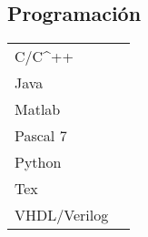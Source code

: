 \documentclass[a4paper,10pt]{article}
\begin{document}
\begin{adjustbox}{valign=t}
\begin{minipage}{0.60\textwidth}
\begin{multicols}{2}
\section*{Programación}
\begin{tabular}{ll}
	C/C^{++}        & 
	\\
	Java            & 
	\\	
	Matlab 	    	& 
	\\
	Pascal 7    	& 
	\\
		Python    	& 
	\\
		Tex 	    & 
	\\
	VHDL/Verilog 	& 
\end{tabular}
\end{multicols}
\end{minipage}
\end{adjustbox}
\end{document}
